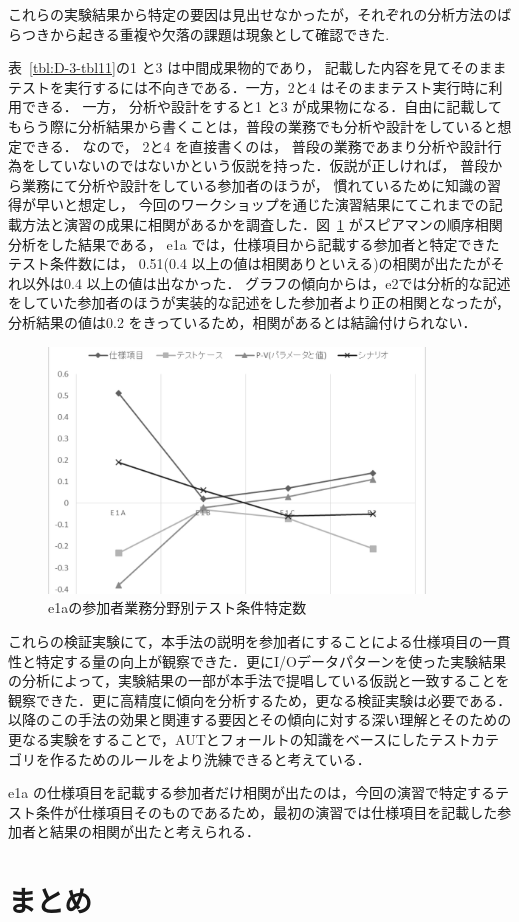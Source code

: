 これらの実験結果から特定の要因は見出せなかったが，それぞれの分析方法のばらつきから起きる重複や欠落の課題は現象として確認できた.

表~\ref{tbl:D-3-tbl11}の1 と3 は中間成果物的であり， 記載した内容を見てそのままテストを実行するには不向きである．一方，2と4 はそのままテスト実行時に利用できる． 一方， 分析や設計をすると1 と3 が成果物になる．自由に記載してもらう際に分析結果から書くことは，普段の業務でも分析や設計をしていると想定できる． なので， 2と4 を直接書くのは， 普段の業務であまり分析や設計行為をしていないのではないかという仮説を持った．仮説が正しければ， 普段から業務にて分析や設計をしている参加者のほうが， 慣れているために知識の習得が早いと想定し， 今回のワークショップを通じた演習結果にてこれまでの記載方法と演習の成果に相関があるかを調査した．図~\ref{fig:D-3-Fig13} がスピアマンの順序相関分析をした結果である， e1a では，仕様項目から記載する参加者と特定できたテスト条件数には， 0.51(0.4 以上の値は相関ありといえる)の相関が出たたがそれ以外は0.4 以上の値は出なかった．
グラフの傾向からは，e2では分析的な記述をしていた参加者のほうが実装的な記述をした参加者より正の相関となったが， 分析結果の値は0.2 をきっているため，相関があるとは結論付けられない．
\begin{figure}[h]
  \begin{center}
  \includegraphics[width=10cm]{./image/D-3-Fig13.png}
  \caption{e1aの参加者業務分野別テスト条件特定数}
  \label{fig:D-3-Fig13}
  \end{center}
   \end{figure}


これらの検証実験にて，本手法の説明を参加者にすることによる仕様項目の一貫性と特定する量の向上が観察できた．更にI/Oデータパターンを使った実験結果の分析によって，実験結果の一部が本手法で提唱している仮説と一致することを観察できた．更に高精度に傾向を分析するため，更なる検証実験は必要である．以降のこの手法の効果と関連する要因とその傾向に対する深い理解とそのための更なる実験をすることで，AUTとフォールトの知識をベースにしたテストカテゴリを作るためのルールをより洗練できると考えている．

e1a の仕様項目を記載する参加者だけ相関が出たのは，今回の演習で特定するテスト条件が仕様項目そのものであるため，最初の演習では仕様項目を記載した参加者と結果の相関が出たと考えられる．

\newpage
\section{まとめ}
